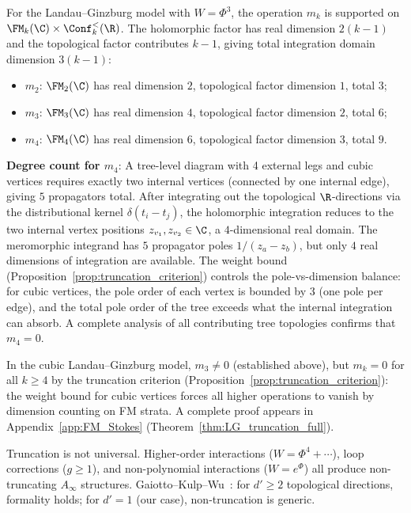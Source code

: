 \begin{example}
\label{ex:truncation_LG_cubic}
For the Landau--Ginzburg model with $W = \Phi^3$, the operation $m_k$ is supported on $\FM_k(\C) \times \Conf_k^<(\R)$. The holomorphic factor has real dimension $2(k-1)$ and the topological factor contributes $k-1$, giving total integration domain dimension $3(k-1)$:
\begin{itemize}
\item $m_2$: $\FM_2(\C)$ has real dimension $2$, topological factor dimension $1$, total $3$;
\item $m_3$: $\FM_3(\C)$ has real dimension $4$, topological factor dimension $2$, total $6$;
\item $m_4$: $\FM_4(\C)$ has real dimension $6$, topological factor dimension $3$, total $9$.
\end{itemize}

\textbf{Degree count for $m_4$}: A tree-level diagram with 4 external legs and cubic vertices requires exactly two internal vertices (connected by one internal edge), giving $5$ propagators total. After integrating out the topological $\R$-directions via the distributional kernel $\delta(t_i - t_j)$, the holomorphic integration reduces to the two internal vertex positions $z_{v_1}, z_{v_2} \in \C$, a $4$-dimensional real domain. The meromorphic integrand has $5$ propagator poles $1/(z_a - z_b)$, but only $4$ real dimensions of integration are available. The weight bound (Proposition~\ref{prop:truncation_criterion}) controls the pole-vs-dimension balance: for cubic vertices, the pole order of each vertex is bounded by $3$ (one pole per edge), and the total pole order of the tree exceeds what the internal integration can absorb. A complete analysis of all contributing tree topologies confirms that $m_4 = 0$.

In the cubic Landau--Ginzburg model, $m_3 \neq 0$ (established above), but $m_k = 0$ for all $k \geq 4$ by the truncation criterion (Proposition~\ref{prop:truncation_criterion}): the weight bound for cubic vertices forces all higher operations to vanish by dimension counting on FM strata. A complete proof appears in Appendix~\ref{app:FM_Stokes} (Theorem~\ref{thm:LG_truncation_full}).
\end{example}

\begin{remark}
\label{rem:nontruncation_general}
Truncation is not universal. Higher-order interactions ($W = \Phi^4 + \cdots$), loop corrections ($g \geq 1$), and non-polynomial interactions ($W = e^\Phi$) all produce non-truncating $A_\infty$ structures. Gaiotto--Kulp--Wu~\cite{GKW25}: for $d' \geq 2$ topological directions, formality holds; for $d' = 1$ (our case), non-truncation is generic.
\end{remark}

